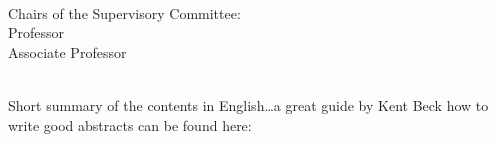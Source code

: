 \begingroup
\let\clearpage\relax
\let\cleardoublepage\relax
\let\cleardoublepage\relax

\thispagestyle{empty}
\begin{center}
     \\
    \bigskip
    {\color{CTtitle}\spacedallcaps{\myTitle} \\ \bigskip
    }
    \bigskip
    \myName \\
    \bigskip
    Chairs of the Supervisory Committee: \\
    Professor \myChair \\
    Associate Professor \myOtherChair \\
    \myDepartment \\
    \bigskip
\end{center}


Short summary of the contents in English\dots a great guide by
Kent Beck how to write good abstracts can be found here:

\endgroup

\vfill
